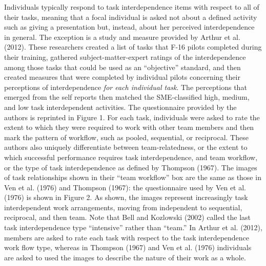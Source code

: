 \documentclass[english,,man]{apa6}
\theoremstyle{definition}
\theoremstyle{definition}
\theoremstyle{definition}
\theoremstyle{remark}
\begin{document}
Individuals typically respond to task interdependence items with respect
to all of their tasks, meaning that a focal individual is asked not
about a defined activity such as giving a presentation but, instead,
about her perceived interdependence in general. The exception is a study
and measure provided by Arthur et al. (2012). These researchers created
a list of tasks that F-16 pilots completed during their training,
gathered subject-matter-expert ratings of the interdependence among
those tasks that could be used as an \enquote{objective} standard, and
then created measures that were completed by individual pilots
concerning their perceptions of interdependence \emph{for each
individual task}. The perceptions that emerged from the self reports
then matched the SME-classified high, medium, and low task
interdependent activities. The questionnaire provided by the authors is
reprinted in Figure 1. For each task, individuals were asked to rate the
extent to which they were required to work with other team members and
then mark the pattern of workflow, such as pooled, sequential, or
reciprocal. These authors also uniquely differentiate between
team-relatedness, or the extent to which successful performance requires
task interdependence, and team workflow, or the type of task
interdependence as defined by Thompson (1967). The images of task
relationships shown in their \enquote{team workflow} box are the same as
those in Ven et al. (1976) and Thompson (1967): the questionnaire used
by Ven et al. (1976) is shown in Figure 2. As shown, the images
represent increasingly task interdependent work arrangements, moving
from independent to sequential, reciprocal, and then team. Note that
Bell and Kozlowski (2002) called the last task interdependence type
\enquote{intensive} rather than \enquote{team.} In Arthur et al. (2012),
members are asked to rate each task with respect to the task
interdependence work flow type, whereas in Thompson (1967) and Ven et
al. (1976) individuals are asked to used the images to describe the
nature of their work as a whole.
\end{document}
